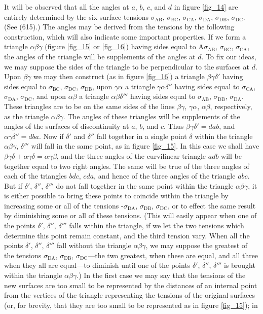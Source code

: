 \documentclass[12pt]{article}
\newcommand{\dd}{\delta}
\begin{document}
It will be observed that all the angles at $a$, $b$, $c$, and $d$ in figure \ref{fig_14} are entirely determined by the six surface-tensions $\sigma_{\text{AB}}$, $\sigma_{\text{BC}}$, $\sigma_{\text{CA}}$, $\sigma_{\text{DA}}$, $\sigma_{\text{DB}}$, $\sigma_{\text{DC}}$. (See (615).) The angles may be derived from the tensions by the following construction, which will also indicate some important properties. If we form a triangle $\alpha\beta\gamma$ (figure \ref{fig_15} or \ref{fig_16}) having sides equal to A$\sigma_{\text{AB}}$, $\sigma_{\text{BC}}$, $\sigma_{\text{CA}}$, the angles of the triangle will be supplements of the angles at $d$. To fix our ideas, we may suppose the sides of the triangle to be perpendicular to the surfaces at $d$. Upon $\beta\gamma$ we may then construct (as in figure \ref{fig_16}) a triangle $\beta\gamma\dd'$ having sides equal to $\sigma_{\text{BC}}$, $\sigma_{\text{DC}}$, $\sigma_{\text{DB}}$, upon $\gamma\alpha$ a triangle $\gamma\alpha\dd''$ having sides equal to $\sigma_{\text{CA}}$, $\sigma_{\text{DA}}$, $\sigma_{\text{DC}}$, and upon $\alpha\beta$ a triangle $\alpha\beta\dd'''$ having sides equal to $\sigma_{\text{AB}}$, $\sigma_{\text{DB}}$, $\sigma_{\text{DA}}$. These triangles are to be on the same sides of the lines $\beta\gamma$, $\gamma\alpha$, $\alpha\beta$, respectively, as the triangle $\alpha\beta\gamma$. The angles of these triangles will be supplements of the angles of the surfaces of discontinuity at $a$, $b$, and $c$. Thus $\beta \gamma\dd'=dab$, and $\alpha \gamma\dd''=dba$. Now if $\dd'$ and $\dd''$ fall together in a single point $\dd$ within the triangle $\alpha \beta\gamma$, $\dd'''$ will fall in the same point, as in figure \ref{fig_15}. In this case we shall have $\beta \gamma \dd + \alpha \gamma \dd =\alpha \gamma \beta$, and the three angles of the curvilinear triangle $adb$ will be together equal to two right angles. The same will be true of the three angles of each of the triangles $bdc$, $cda$, and hence of the three angles of the triangle $abc$. But if $\dd'$, $\dd''$, $\dd'''$ do not fall together in the same point within the triangle $\alpha \beta \gamma$, it is either possible to bring these points to coincide within the triangle by increasing some or all of the tensions -$\sigma_{\text{DA}}$, $\sigma_{\text{DB}}$, $\sigma_{\text{DC}}$, or to effect the same result by diminishing some or all of these tensions. (This will easily appear when one of the points $\dd'$, $\dd''$, $\dd'''$ falls within the triangle, if we let the two tensions which determine this point remain constant, and the third tension vary. When all the points $\dd'$, $\dd''$, $\dd'''$ fall without the triangle $\alpha \beta \gamma$, we may suppose the greatest of the tensions $\sigma_{\text{DA}}$, $\sigma_{\text{DB}}$, $\sigma_{\text{DC}}$---the two greatest, when these are equal, and all three when they all are equal---to diminish until one of the points $\dd'$, $\dd''$, $\dd'''$ is brought within the triangle $\alpha \beta \gamma$.) In the first case we may say that the tensions of the new surfaces are too small to be represented by the distances of an internal point from the vertices of the triangle representing the tensions of the original surfaces (or, for brevity, that they are too small to be represented as in figure \ref{fig_15}); in 
\end{document}
